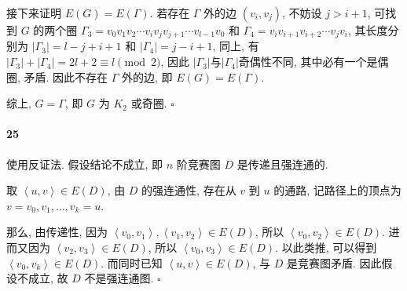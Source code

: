 \documentclass{ctexart}
\def\QED{\hfill $\square$}
\def\pair#1{\left\langle #1 \right\rangle}
\begin{document}
接下来证明 $E(G)=E(\Gamma)$. 若存在 $\Gamma$ 外的边 $(v_i,v_j)$,
不妨设 $j>i+1$, 可找到 $G$ 的两个圈 
$\Gamma_3=v_0v_1v_2\cdots v_iv_jv_{j+1}\cdots v_{l-1}v_0$ 和
$\Gamma_4=v_iv_{i+1}v_{i+2}\cdots v_jv_i$,
其长度分别为 $|\Gamma_3| = l-j+i+1$ 和 $|\Gamma_4| = j-i+1$,
同上, 有$|\Gamma_3|+|\Gamma_4| = 2l+2\equiv l \pmod 2$,
因此 $|\Gamma_3|$与$|\Gamma_4|$奇偶性不同,
其中必有一个是偶圈, 矛盾. 因此不存在 $\Gamma$ 外的边,
即 $E(G)=E(\Gamma)$.

综上, $G=\Gamma$, 即 $G$ 为 $K_2$ 或奇圈. \QED

\paragraph*{25} 使用反证法. 假设结论不成立, 即 $n$ 阶竞赛图 $D$ 
是传递且强连通的.

取 $\pair{u,v}\in E(D)$, 由 $D$ 的强连通性, 存在从 $v$ 到 $u$ 的通路,
记路径上的顶点为 $v=v_0,v_1,\ldots,v_k=u$. 

那么, 由传递性, 因为 $\pair{v_0,v_1},\pair{v_1,v_2}\in E(D)$, 
所以 $\pair{v_0,v_2}\in E(D)$.
进而又因为 $\pair{v_2,v_3}\in E(D)$, 所以 $\pair{v_0,v_3}\in E(D)$.
以此类推, 可以得到 $\pair{v_0,v_k}\in E(D)$.
而同时已知 $\pair{u,v}\in E(D)$, 与 $D$ 是竞赛图矛盾.
因此假设不成立, 故 $D$ 不是强连通图. \QED

\end{document}
